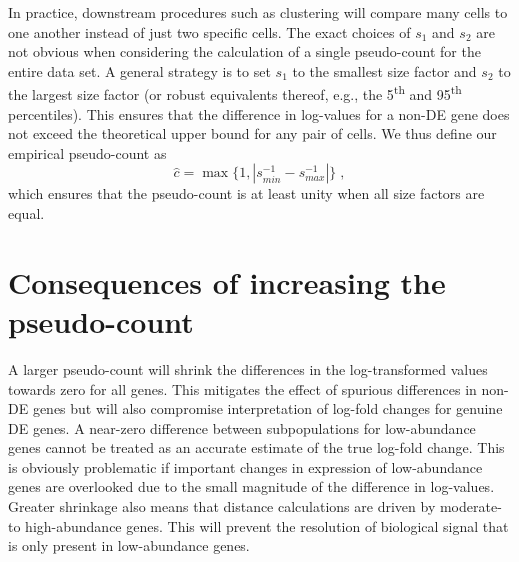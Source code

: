 \documentclass[10pt,letterpaper]{article}
\begin{document}
In practice, downstream procedures such as clustering will compare many cells to one another instead of just two specific cells.
The exact choices of $s_1$ and $s_2$ are not obvious when considering the calculation of a single pseudo-count for the entire data set.
A general strategy is to set $s_1$ to the smallest size factor and $s_2$ to the largest size factor
(or robust equivalents thereof, e.g., the 5\textsuperscript{th} and 95\textsuperscript{th} percentiles).
This ensures that the difference in log-values for a non-DE gene does not exceed the theoretical upper bound for any pair of cells.
We thus define our empirical pseudo-count as
\[
\hat c = \max\{1, |s_{min}^{-1} - s_{max}^{-1}|\} \;,
\]
which ensures that the pseudo-count is at least unity when all size factors are equal.

\section{Consequences of increasing the pseudo-count}
A larger pseudo-count will shrink the differences in the log-transformed values towards zero for all genes.
This mitigates the effect of spurious differences in non-DE genes but will also compromise interpretation of log-fold changes for genuine DE genes.
A near-zero difference between subpopulations for low-abundance genes cannot be treated as an accurate estimate of the true log-fold change. 
This is obviously problematic if important changes in expression of low-abundance genes are overlooked due to the small magnitude of the difference in log-values.
Greater shrinkage also means that distance calculations are driven by moderate- to high-abundance genes.
This will prevent the resolution of biological signal that is only present in low-abundance genes.


\end{document}
